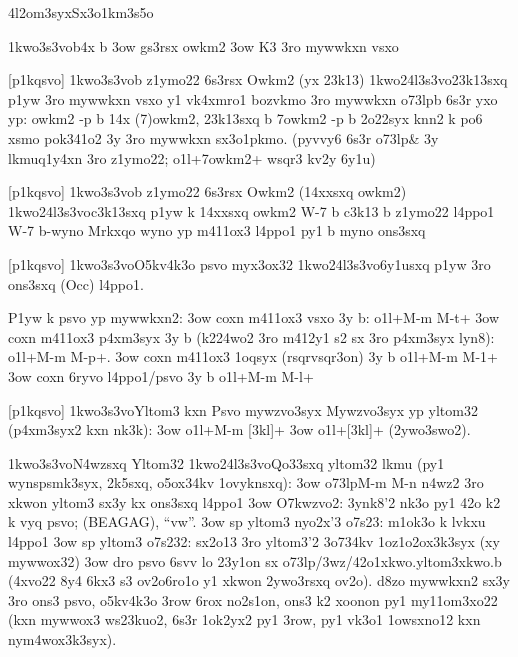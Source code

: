 \24l2om3syx{Sx3o1km3s5o}

  \p1kwo3s3vo{b4x b}
  \s3ow gs3rsx owkm2
  \s3ow K3 3ro mywwkxn vsxo

[p1kqsvo]
  \p1kwo3s3vo{b z1ymo22 6s3rsx Owkm2 (yx 23k13)}
  \p1kwo24l3s3vo{23k13sxq p1yw 3ro mywwkxn vsxo y1 vk4xmro1}
  bozvkmo 3ro mywwkxn \3o73lp{b} 6s3r yxo yp:
owkm2 -p b        14x (7)owkm2, 23k13sxq b
7owkm2 -p b       2o22syx                   
  knn2 k po6 xsmo pok341o2 3y 3ro mywwkxn sx3o1pkmo.  (pyvvy6 6s3r
  \3o73lp{\&} 3y lkmuq1y4xn 3ro z1ymo22; \5o1l+7owkm2+ wsqr3 kv2y
  6y1u)

[p1kqsvo]
  \p1kwo3s3vo{b z1ymo22 6s3rsx Owkm2 (14xxsxq owkm2)}
  \p1kwo24l3s3vo{c3k13sxq p1yw k 14xxsxq owkm2}
W-7 b         c3k13 b z1ymo22 l4ppo1
W-7 b-wyno    Mrkxqo wyno yp m411ox3 l4ppo1
              py1 b myno ons3sxq

[p1kqsvo]
  \p1kwo3s3vo{O5kv4k3o psvo myx3ox32}
  \p1kwo24l3s3vo{6y1usxq p1yw 3ro ons3sxq (Occ) l4ppo1}. 

  P1yw k psvo yp mywwkxn2:
  \s3ow coxn m411ox3 vsxo 3y b: \5o1l+M-m M-t+
  \s3ow coxn m411ox3 p4xm3syx 3y b (k224wo2 3ro m412y1 s2 sx 3ro
    p4xm3syx lyn8): \5o1l+M-m M-p+.
  \s3ow coxn m411ox3 1oqsyx (rsqrvsqr3on) 3y b  \5o1l+M-m M-1+
  \s3ow coxn 6ryvo l4ppo1/psvo 3y b  \5o1l+M-m M-l+

[p1kqsvo]
  \p1kwo3s3vo{Yltom3 kxn Psvo mywzvo3syx}
  Mywzvo3syx yp yltom32 (p4xm3syx2 kxn nk3k):
  \s3ow \5o1l+M-m [3kl]+
  \s3ow \5o1l+[3kl]+ (2ywo3swo2).

  \p1kwo3s3vo{N4wzsxq Yltom32}
  \p1kwo24l3s3vo{Qo33sxq yltom32 lkmu}
  (py1 wynspsmk3syx, 2k5sxq, o5ox34kv 1ovyknsxq):
  \s3ow \3o73lp{M-m M-n} n4wz2 3ro xkwon yltom3 sx3y kx ons3sxq l4ppo1
  \s3ow O7kwzvo2: 3ynk8'2 nk3o py1 42o k2 k vyq psvo; (BEAGAG), ``vw''.
  \s3ow sp yltom3 nyo2x'3 o7s23: m1ok3o k lvkxu l4ppo1
  \s3ow sp yltom3 o7s232: sx2o13 3ro yltom3'2 3o734kv 1oz1o2ox3k3syx (xy mywwox32)
  \s3ow dro psvo 6svv lo 23y1on sx \3o73lp{/3wz/42o1xkwo.yltom3xkwo.b}
    (4xvo22 8y4 6kx3 s3 ov2o6ro1o y1 xkwon 2ywo3rsxq ov2o).
  d8zo mywwkxn2 sx3y 3ro ons3 psvo, o5kv4k3o 3row 6rox no2s1on, ons3
  k2 xoonon py1 my11om3xo22 (kxn mywwox3 ws23kuo2, 6s3r 1ok2yx2 py1
  3row, py1 vk3o1 1owsxno12 kxn nym4wox3k3syx).

